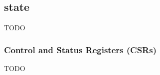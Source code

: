 \subsection{\XCID state}
\label{sec:spec:state}

TODO



\subsubsection{Control and Status Registers (CSRs)}
\label{sec:spec:state:csr}

TODO

